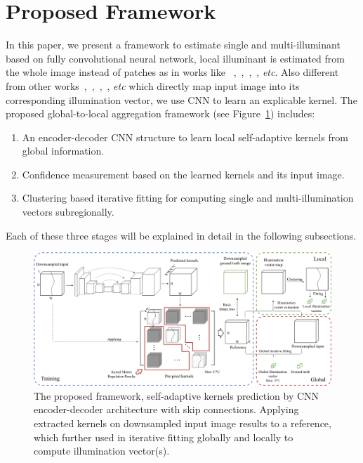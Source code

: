 \documentclass[10pt,twocolumn,letterpaper]{article}
\begin{document}
\section{Proposed Framework}
\label{section_framework}
In this paper, we present a framework to estimate single and multi-illuminant based on fully convolutional neural network,
local illuminant is estimated from the whole image instead of patches as in works like
~\cite{riess2011illuminant},~\cite{beigpour2014multi},~\cite{gijsenij2012color},~\cite{bianco2015single}, \textit{etc}.
Also different from other works~\cite{bianco2015color},~\cite{lou2015color},~\cite{shi2016deep},~\cite{hu2017fc}, \textit{etc}
which directly map input image into its corresponding illumination vector, we use CNN to learn an explicable kernel.
The proposed global-to-local aggregation framework (see Figure~\ref{fig:framework}) includes:
\begin{enumerate}
  \setcounter{enumi}{0}
  \item
  An encoder-decoder CNN structure to learn local self-adaptive kernels from global information.
  \item Confidence measurement based on the learned kernels and its input image.
  \item Clustering based iterative fitting for computing single and multi-illumination vectors subregionally.
\end{enumerate}
Each of these three stages will be explained in detail in the following subsections.

\begin{figure}
\begin{center}
\includegraphics[width=\linewidth]{../Images/framework.png}
\end{center}
   \caption{The proposed framework,
   self-adaptive kernels prediction by CNN encoder-decoder architecture with skip connections.
   Applying extracted kernels on downsampled input image results to a reference,
   which further used in iterative fitting globally and locally to compute illumination vector(s).
   }
\label{fig:framework}
\end{figure}
\end{document}
